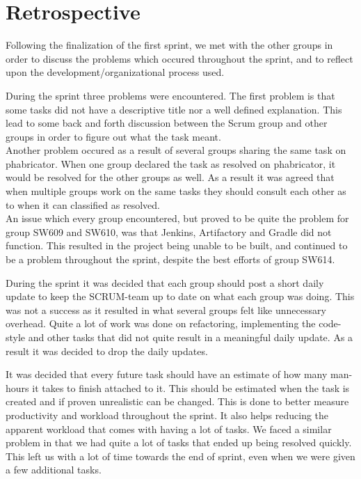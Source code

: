 \section{Retrospective}\label{S2Retro}
Following the finalization of the first sprint, we met with the other
groups in order to discuss the problems which occured
throughout the sprint, and to reflect upon the development/organizational
process used.\nl

During the sprint three problems were encountered. The first problem is that
some tasks did not have a descriptive title nor a well defined explanation.
This lead to some back and forth discussion between the Scrum group and other
groups in order to figure out what the task meant.\\
Another problem occured as a result of several groups sharing the same task on
phabricator. When one group declared the task as resolved on phabricator, it
would be resolved for the other groups as well. As a result it was agreed that
when multiple groups work on the same tasks they should consult each other as to
when it can classified as resolved.\\
An issue which every group encountered, but proved to be quite the problem for
group SW609 and SW610, was that Jenkins, Artifactory and Gradle did not
function.
This resulted in the project being unable to be built, and continued to be a
problem throughout the sprint, despite the best efforts of group SW614.\nl

During the sprint it was decided that each group should post a short daily
update to keep the SCRUM-team up to date on what each group was doing. This was
not a success as it resulted in what several groups felt like unnecessary
overhead. Quite a lot of work was done on refactoring, implementing the
code-style and other tasks that did not quite result in a meaningful daily
update. As a result it was decided to drop the daily updates.\nl

It was decided that every future task should have an estimate of how many
man-hours it takes to finish attached to it. This should be estimated when the
task is created and if proven unrealistic can be changed. This is done to
better measure productivity and workload throughout the sprint. It also helps
reducing the apparent workload that comes with having a lot of tasks. We faced a
similar problem in that we had quite a lot of tasks that ended up being resolved
quickly. This left us with a lot of time towards the end of sprint, even when we
were given a few additional tasks.

